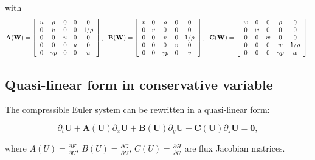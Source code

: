 \documentclass{article}
\begin{document}
with
\begin{equation}
  \mathbf{A(W)} = \left[
    \begin{array}{c c c c c}
      u & \rho     & 0 & 0 & 0 \\
      0 & u        & 0 & 0 & 1/\rho\\
      0 & 0        & u & 0 & 0 \\
      0 & 0        & 0 & u & 0 \\
      0 & \gamma p & 0 & 0 & u \\
    \end{array}
  \right],
  \;\;
  \mathbf{B(W)} = \left[
    \begin{array}{c c c c c}
      v & 0 & \rho     & 0 & 0 \\
      0 & v & 0        & 0 & 0\\
      0 & 0 & v        & 0 & 1/\rho \\
      0 & 0 & 0        & v & 0 \\
      0 & 0 & \gamma p & 0 & v \\
    \end{array}
  \right],
  \;\;
  \mathbf{C(W)} = \left[
    \begin{array}{c c c c c}
      w & 0 & 0 & \rho     & 0 \\
      0 & w & 0 & 0        & 0\\
      0 & 0 & w & 0        & 0 \\
      0 & 0 & 0 & w        & 1/\rho \\
      0 & 0 & 0 & \gamma p & w \\
    \end{array}
  \right].
\end{equation}


\subsection{Quasi-linear form in conservative variable}

The compressible Euler system can be rewritten in a quasi-linear form:

\begin{equation}
  \partial_t \mathbf{U} + \mathbf{A(U)} \partial_x \mathbf{U} + \mathbf{B(U)} \partial_y \mathbf{U} + \mathbf{C(U)} \partial_z \mathbf{U} = \mathbf{0},
\end{equation}

where $A(U)=\frac{\partial F}{\partial U}$, $B(U)=\frac{\partial G}{\partial U}$, $C(U)=\frac{\partial H}{\partial U}$ are flux Jacobian matrices.
\end{document}
